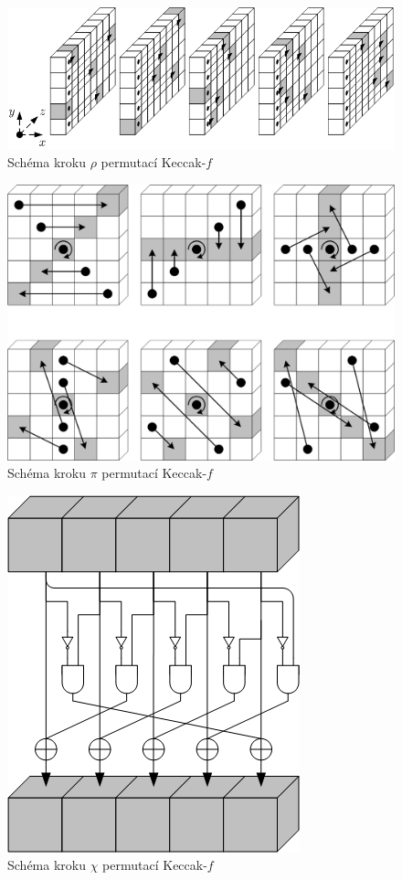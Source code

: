 \documentclass[titlepage,a4paper,12pt]{article}
\begin{document}
\begin{figure}[ht!]
\centering
\includegraphics[scale=0.9]{rho.png}
\caption{Schéma kroku \(\rho\) permutací Keccak-\(f\)}
\label{fig:rho}
\end{figure}

\begin{figure}[ht!]
\centering
\includegraphics[scale=0.75]{pi.png}
\caption{Schéma kroku \(\pi\) permutací Keccak-\(f\)}
\label{fig:pi}
\end{figure}

\begin{figure}[ht!]
\centering
\includegraphics[scale=0.9]{chi.png}
\caption{Schéma kroku \(\chi\) permutací Keccak-\(f\)}
\label{fig:chi}
\end{figure}
\end{document}
